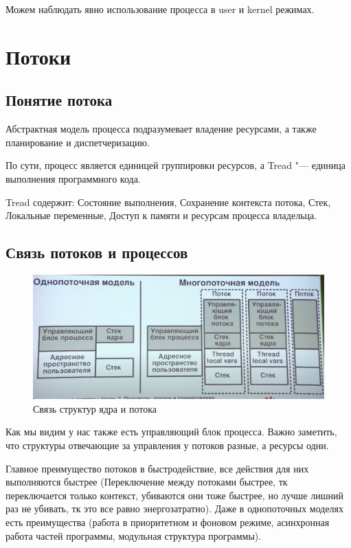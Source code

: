 \documentclass[bachelor, och, book]{SCWorks}
\theoremstyle{remark}
\begin{document}
    Можем наблюдать явно использование процесса в user и kernel режимах.

    \section{Потоки}

    \subsection{Понятие потока}

    Абстрактная модель процесса подразумевает владение ресурсами, а также планирование и диспетчеризацию. 

    По сути, процесс является единицей группировки ресурсов, а Tread "--- единица выполнения программного кода.

    Tread содержит: Состояние выполнения, Сохранение контекста потока, Стек, Локальные переменные, Доступ к памяти и ресурсам процесса владельца.

    \subsection{Связь потоков и процессов}

    \begin{figure}[H]
        \begin{center}
            \includegraphics[scale=0.40]{res/connection-of-kernel-and-thread-structures.png}
            \caption{Связь структур ядра и потока}
        \end{center}
    \end{figure}

    Как мы видим у нас также есть управляющий блок процесса. Важно заметить, что структуры отвечающие за управления у потоков разные, а ресурсы одни.

    Главное преимущество потоков в быстродействие, все действия для них выполняются быстрее (Переключение между потоками быстрее, тк переключается только контекст, убиваются они тоже быстрее, но лучше лишний раз не убивать, тк это все равно энергозатратно). Даже в однопоточных моделях есть преимущества (работа в приоритетном и фоновом режиме, асинхронная работа частей программы, модульная структура программы). 
\end{document}

